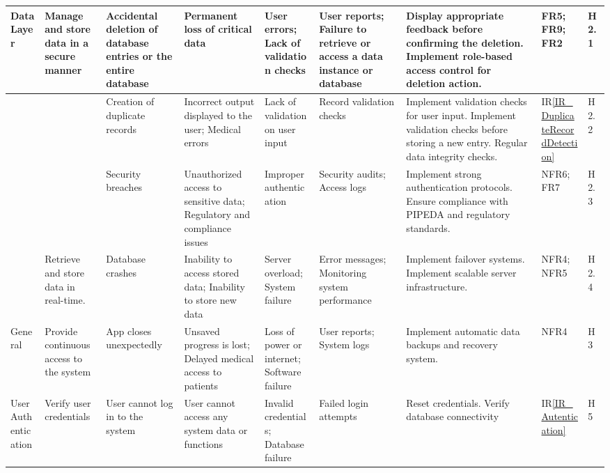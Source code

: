 \documentclass{article}
\begin{document}
\begin{landscape}
\begin{longtable}{|p{1.5cm}|p{2cm}|p{2.6cm}|p{2cm}|p{2cm}|p{2cm}|p{3.5cm}|p{1cm}|p{0.8cm}|}
        \midrule
        Data Layer & \raggedright Manage and store data in a secure manner & \raggedright Accidental deletion of database entries or the entire database & \raggedright Permanent loss of critical data & \raggedright User errors; Lack of validation checks & \raggedright User reports; Failure to retrieve or access a data instance or database & \raggedright Display appropriate feedback before confirming the deletion. Implement role-based access control for deletion action. & FR5; FR9; FR2 & H2.1 \\ 
        \midrule
        & & \raggedright Creation of duplicate records & \raggedright Incorrect output displayed to the user; Medical errors & \raggedright Lack of validation on user input & \raggedright Record validation checks & \raggedright Implement validation checks for user input. Implement validation checks before storing a new entry. Regular data integrity checks. & IR\ref{IR_DuplicateRecordDetection} & H2.2 \\ 
        \midrule
        & & \raggedright Security breaches & \raggedright Unauthorized access to sensitive data; Regulatory and compliance issues & \raggedright Improper authentication & \raggedright Security audits; Access logs & \raggedright Implement strong authentication protocols. Ensure compliance with PIPEDA and regulatory standards. & NFR6; FR7 & H2.3 \\ 
        \midrule
        & \raggedright Retrieve and store data in real-time. & \raggedright Database crashes & \raggedright Inability to access stored data; Inability to store new data & \raggedright Server overload; System failure & \raggedright Error messages; Monitoring system performance & \raggedright Implement failover systems. Implement scalable server infrastructure. & NFR4; NFR5 & H2.4 \\ 
        \midrule
        General & \raggedright Provide continuous access to the system & \raggedright App closes unexpectedly & \raggedright Unsaved progress is lost; Delayed medical access to patients & \raggedright Loss of power or internet; Software failure & \raggedright User reports; System logs & \raggedright Implement automatic data backups and recovery system. & NFR4 & H3 \\
        \midrule
        User Authentication & \raggedright Verify user credentials & \raggedright User cannot log in to the system & \raggedright User cannot access any system data or functions & \raggedright Invalid credentials; Database failure & \raggedright Failed login attempts & \raggedright Reset credentials. Verify database connectivity & IR\ref{IR_Autentication} & H5 \\

\end{longtable}
\end{landscape}
\end{document}
